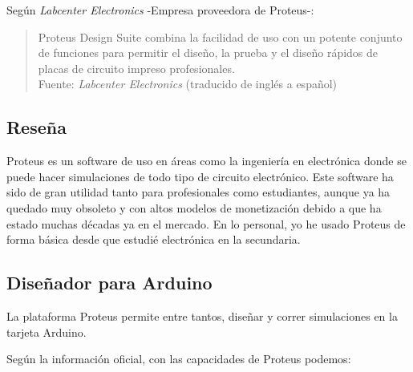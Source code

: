 \documentclass{article}
\begin{document}
Según \textit{Labcenter Electronics}\cite{labcenter-electronics-2022} -Empresa proveedora de Proteus-:

\begin{quote}
    Proteus Design Suite combina la facilidad de uso con un potente conjunto de funciones para permitir el diseño, la prueba y el diseño rápidos de placas de circuito impreso profesionales.\\ \footnotesize
    Fuente: \textit{Labcenter Electronics} (traducido de inglés a español) \cite{labcenter-electronics-2022}
\end{quote}

\subsection{Reseña}

Proteus es un software de uso en áreas como la ingeniería en electrónica donde se puede hacer simulaciones de todo tipo de circuito electrónico. Este software ha sido de gran utilidad tanto para profesionales como estudiantes, aunque ya ha quedado muy obsoleto y con altos modelos de monetización debido a que ha estado muchas décadas ya en el mercado. En lo personal, yo he usado Proteus de forma básica desde que estudié electrónica en la secundaria.

\subsection{Diseñador para Arduino}

La plataforma Proteus permite entre tantos, diseñar y correr simulaciones en la tarjeta Arduino.

\bigbreak

Según la información oficial, con las capacidades de Proteus podemos:
\end{document}
